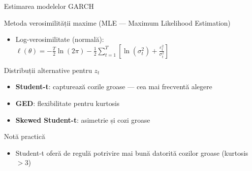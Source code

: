 \documentclass[9pt, aspectratio=169, t]{beamer}
\begin{document}
\begin{frame}{Estimarea modelelor GARCH}
    \small
    \vspace{-0.2cm}
        \begin{block}{Metoda verosimilității maxime (MLE --- Maximum Likelihood Estimation)}
            \begin{itemize}
                \item Log-verosimilitate (normală): $\ell(\theta) = -\frac{T}{2} \ln(2\pi) - \frac{1}{2} \sum_{t=1}^{T} \left[ \ln(\sigma_t^2) + \frac{\varepsilon_t^2}{\sigma_t^2} \right]$
            \end{itemize}
        \end{block}
        \vspace{-0.1cm}
        \begin{block}{Distribuții alternative pentru $z_t$}
            \begin{itemize}
                \item \textbf{Student-t}: capturează cozile groase --- cea mai frecventă alegere
                \item \textbf{GED}: flexibilitate pentru kurtosis
                \item \textbf{Skewed Student-t}: asimetrie și cozi groase
            \end{itemize}
        \end{block}
        \vspace{-0.1cm}
        \begin{alertblock}{Notă practică}
            \begin{itemize}
                \item Student-t oferă de regulă potrivire mai bună datorită cozilor groase (kurtosis $> 3$)
            \end{itemize}
        \end{alertblock}
\end{frame}
\end{document}
